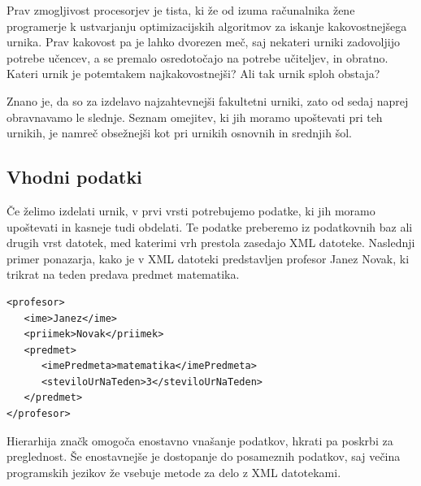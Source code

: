 \documentclass[a4paper,10pt]{article}
\begin{document}
Prav zmogljivost procesorjev je tista, ki že od izuma računalnika žene programerje k
ustvarjanju optimizacijskih algoritmov za iskanje kakovostnejšega urnika. Prav kakovost
pa je lahko dvorezen meč, saj nekateri urniki zadovoljijo potrebe učencev, a se premalo
osredotočajo na potrebe učiteljev, in obratno. Kateri urnik je potemtakem najkakovostnejši?
Ali tak urnik sploh obstaja?

Znano je, da so za izdelavo najzahtevnejši fakultetni urniki, zato od sedaj naprej
obravnavamo le slednje. Seznam omejitev, ki jih moramo upoštevati pri teh urnikih,
je namreč obsežnejši kot pri urnikih osnovnih in srednjih šol.
\pagebreak
\subsection{Vhodni podatki} %

Če želimo izdelati urnik, v prvi vrsti potrebujemo podatke, ki jih moramo upoštevati in
kasneje tudi obdelati. Te podatke preberemo iz podatkovnih baz ali drugih vrst datotek,
med katerimi vrh prestola zasedajo XML datoteke. Naslednji primer ponazarja, kako je v
XML datoteki predstavljen profesor Janez Novak, ki trikrat na teden predava predmet
matematika.


 \begin{verbatim} 
<profesor>
   <ime>Janez</ime>
   <priimek>Novak</priimek>
   <predmet>
      <imePredmeta>matematika</imePredmeta>
      <steviloUrNaTeden>3</steviloUrNaTeden>
   </predmet>
</profesor>
\end{verbatim}

\noindent 
Hierarhija značk omogoča enostavno vnašanje podatkov, hkrati pa poskrbi za preglednost.
Še enostavnejše je dostopanje do posameznih podatkov, saj večina programskih jezikov že
vsebuje metode za delo z XML datotekami.
\end{document}
